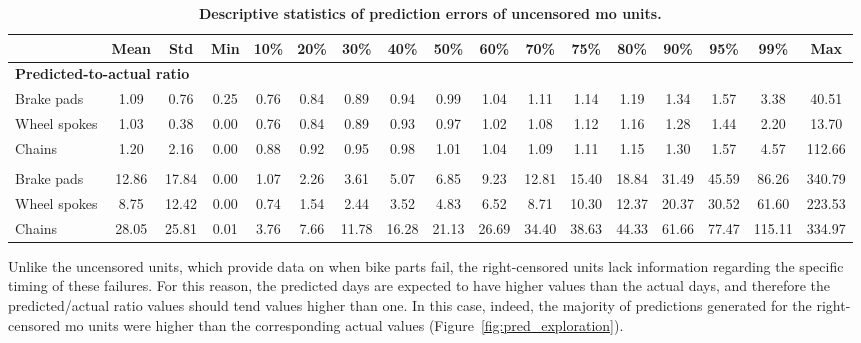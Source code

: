         \begin{table}
            \centering
            \footnotesize
            \caption[Descriptive statistics of prediction errors of uncensored MO units]{
                \textbf{Descriptive statistics of prediction errors of uncensored \ac{mo} units.}
            }
            \label{tab:pred_actual_statistics}
            \begin{tabular}{
                lcccccccccccccccc
            }
            \toprule
                            & {Mean} & {Std} & {Min} & {10\%} & {20\%} & {30\%} & {40\%} & {50\%} & {60\%} & {70\%} & {75\%} & {80\%} & {90\%} & {95\%} & {99\%} & {Max}    \\
            \midrule
            \multicolumn{17}{l}{\textbf{Predicted-to-actual ratio}} \\
            Brake pads   & 1.09  & 0.76  & 0.25 & 0.76 & 0.84 & 0.89  & 0.94  & 0.99  & 1.04  & 1.11  & 1.14  & 1.19  & 1.34  & 1.57  & 3.38   & 40.51  \\
            Wheel spokes & 1.03  & 0.38  & 0.00 & 0.76 & 0.84 & 0.89  & 0.93  & 0.97  & 1.02  & 1.08  & 1.12  & 1.16  & 1.28  & 1.44  & 2.20   & 13.70  \\
            Chains       & 1.20  & 2.16  & 0.00 & 0.88 & 0.92 & 0.95  & 0.98  & 1.01  & 1.04  & 1.09  & 1.11  & 1.15  & 1.30  & 1.57  & 4.57   & 112.66 \\
            \addlinespace
            \multicolumn{17}{l}{\textbf{$|$Predicted $-$ actual$|$ (days)}} \\
            Brake pads   & 12.86 & 17.84 & 0.00 & 1.07 & 2.26 & 3.61  & 5.07  & 6.85  & 9.23  & 12.81 & 15.40 & 18.84 & 31.49 & 45.59 & 86.26  & 340.79 \\
            Wheel spokes & 8.75  & 12.42 & 0.00 & 0.74 & 1.54 & 2.44  & 3.52  & 4.83  & 6.52  & 8.71  & 10.30 & 12.37 & 20.37 & 30.52 & 61.60  & 223.53 \\
            Chains       & 28.05 & 25.81 & 0.01 & 3.76 & 7.66 & 11.78 & 16.28 & 21.13 & 26.69 & 34.40 & 38.63 & 44.33 & 61.66 & 77.47 & 115.11 & 334.97 \\
            \bottomrule
            \end{tabular}  
        \end{table}

    Unlike the uncensored units, which provide data on when bike parts fail, the right-censored units lack information regarding the specific timing of these failures. For this reason, the predicted days are expected to have higher values than the actual days, and therefore the predicted/actual ratio values should tend values higher than one. In this case, indeed, the majority of predictions generated for the right-censored \ac{mo} units were higher than the corresponding actual values (Figure~\ref{fig:pred_exploration}).

